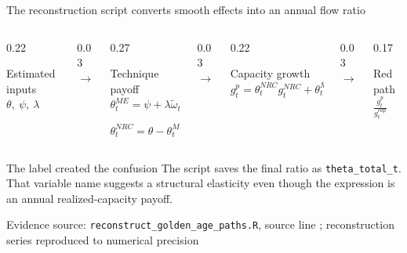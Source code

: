 \documentclass[10pt,aspectratio=169]{beamer}
\newcommand{\sourcefooter}[1]{%
  \par\vfill{\tiny\color{gray!70}Evidence source: #1}\vspace{-0.35em}}
\begin{document}
\begin{frame}{The reconstruction script converts smooth effects into an annual flow ratio}
  \begin{columns}[T,onlytextwidth]
    \begin{column}{0.22\textwidth}
      \begin{block}{Estimated inputs}
        \centering
        $\theta,\ \psi,\ \lambda$
      \end{block}
    \end{column}
    \begin{column}{0.03\textwidth}\centering $\rightarrow$\end{column}
    \begin{column}{0.27\textwidth}
      \begin{block}{Technique payoff}
        \centering
        $\theta_t^{ME}=\psi+\lambda\widetilde\omega_t$

        $\theta_t^{NRC}=\theta-\theta_t^{ME}$
      \end{block}
    \end{column}
    \begin{column}{0.03\textwidth}\centering $\rightarrow$\end{column}
    \begin{column}{0.22\textwidth}
      \begin{block}{Capacity growth}
        \centering
        $g_t^p=\theta_t^{NRC}g_t^{NRC}+\theta_t^{ME}g_t^{ME}$
      \end{block}
    \end{column}
    \begin{column}{0.03\textwidth}\centering $\rightarrow$\end{column}
    \begin{column}{0.17\textwidth}
      \begin{alertblock}{Red path}
        \centering
        $\displaystyle\frac{g_t^p}{g_t^{cap}}$
      \end{alertblock}
    \end{column}
  \end{columns}

  \vspace{1em}
  \begin{block}{The label created the confusion}
    The script saves the final ratio as \texttt{theta\_total\_t}. That variable name suggests a structural elasticity even though the expression is an annual realized-capacity payoff.
  \end{block}
  \sourcefooter{\texttt{reconstruct\_golden\_age\_paths.R}, source line \LineReconstructionRatio; reconstruction series reproduced to numerical precision}
\end{frame}
\end{document}

